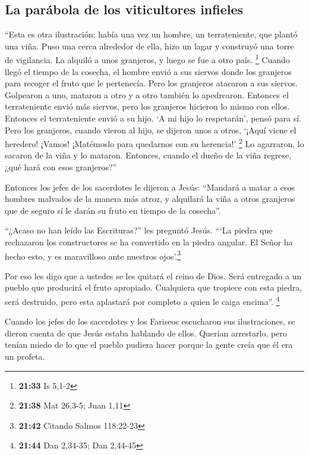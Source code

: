 \hypertarget{la-paruxe1bola-de-los-viticultores-infieles}{%
\subsection{La parábola de los viticultores
infieles}\label{la-paruxe1bola-de-los-viticultores-infieles}}

 ``Esta es otra ilustración: había una vez un hombre, un
terrateniente, que plantó una viña. Puso una cerca alrededor de ella,
hizo un lagar y construyó una torre de vigilancia. La alquiló a unos
granjeros, y luego se fue a otro país. \footnote{\textbf{21:33} Is 5,1-2}
 Cuando llegó el tiempo de la cosecha, el hombre envió a
sus siervos donde los granjeros para recoger el fruto que le pertenecía.
 Pero los granjeros atacaron a sus siervos. Golpearon a
uno, mataron a otro y a otro también lo apedrearon. 
Entonces el terrateniente envió más siervos, pero los granjeros hicieron
lo mismo con ellos.  Entonces el terrateniente envió a su
hijo. `A mi hijo lo respetarán', pensó para sí.  Pero los
granjeros, cuando vieron al hijo, se dijeron unos a otros, `¡Aquí viene
el heredero! ¡Vamos! ¡Matémoslo para quedarnos con su herencia!'
\footnote{\textbf{21:38} Mat 26,3-5; Juan 1,11}  Lo
agarraron, lo sacaron de la viña y lo mataron.  Entonces,
cuando el dueño de la viña regrese, ¿qué hará con esos granjeros?''

 Entonces los jefes de los sacerdotes le dijeron a Jesús:
``Mandará a matar a esos hombres malvados de la manera más atroz, y
alquilará la viña a otros granjeros que de seguro sí le darán su fruto
en tiempo de la cosecha''.

 ``¿Acaso no han leído las Escrituras?'' les preguntó
Jesús. ```La piedra que rechazaron los constructores se ha convertido en
la piedra angular. El Señor ha hecho esto, y es maravilloso ante
nuestros ojos'.\footnote{\textbf{21:42} Citando Salmos 118:22-23}

 Por eso les digo que a ustedes se les quitará el reino
de Dios. Será entregado a un pueblo que producirá el fruto apropiado.
 Cualquiera que tropiece con esta piedra, será destruido,
pero esta aplastará por completo a quien le caiga encima''. \footnote{\textbf{21:44}
  Dan 2,34-35; Dan 2,44-45}

 Cuando los jefes de los sacerdotes y los Fariseos
escucharon sus ilustraciones, se dieron cuenta de que Jesús estaba
hablando de ellos.  Querían arrestarlo, pero tenían miedo
de lo que el pueblo pudiera hacer porque la gente creía que él era un
profeta.

